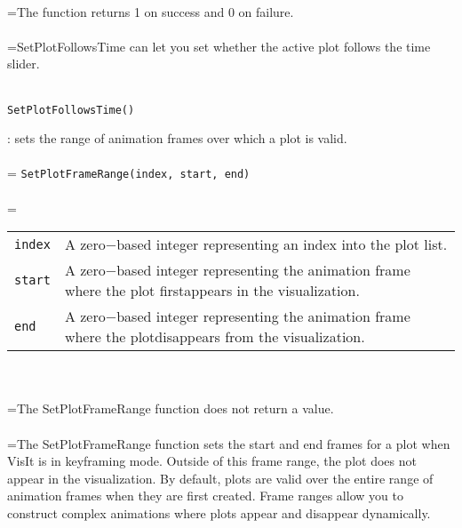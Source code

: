 \documentclass[10pt,a4paper]{report}
\begin{document}
 \\ 
\hangindent=\parindent The function returns 1 on success and 0 on failure. \\[-3mm] 

 \\ 
\hangindent=\parindent SetPlotFollowsTime can let you set whether the active plot follows the time slider. \\[-3mm] 

\\[-6mm]
\begin{verbatim}SetPlotFollowsTime()
\end{verbatim}
\newpage


{}
: sets the range of animation frames over which a plot is valid.\\[-3mm]

 \\ 
\hangindent=\parindent 
\verb!SetPlotFrameRange(index, start, end)!\\ [-3mm]

 \\ 
\hangindent=\parindent 
\begin{tabular}{lp{9cm}}
\verb!index! & A zero$-$based integer representing an index into the plot list. \\
\verb!start! & A zero$-$based integer representing the animation frame where the plot firstappears in the visualization. \\
\verb!end! & A zero$-$based integer representing the animation frame where the plotdisappears from the visualization. \\
\end{tabular} \\[-2mm]


 \\ 
\hangindent=\parindent The SetPlotFrameRange function does not return a value. \\[-3mm] 

 \\ 
\hangindent=\parindent The SetPlotFrameRange function sets the start and end frames for a plot when VisIt is in keyframing mode. Outside of this frame range, the plot does not appear in the visualization. By default, plots are valid over the entire range of animation frames when they are first created. Frame ranges allow you to construct complex animations where plots appear and disappear dynamically. \\[-3mm] 
\end{document}
